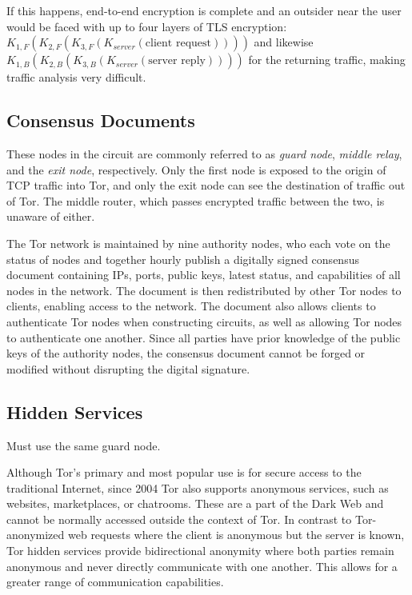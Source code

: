  If this happens, end-to-end encryption is complete and an outsider near the user would be faced with up to four layers of TLS encryption: $K_{1,F}(K_{2,F}(K_{3,F}(K_{server}(\textrm{client\ request}))))$ and likewise $K_{1,B}(K_{2,B}(K_{3,B}(K_{server}(\textrm{server\ reply}))))$ for the returning traffic, making traffic analysis very difficult.

\subsection{Consensus Documents}
\label{sec:ConsensusDocs}

These nodes in the circuit are commonly referred to as \textit{guard node}, \textit{middle relay}, and the \textit{exit node}, respectively. Only the first node is exposed to the origin of TCP traffic into Tor, and only the exit node can see the destination of traffic out of Tor. The middle router, which passes encrypted traffic between the two, is unaware of either.

The Tor network is maintained by nine authority nodes, who each vote on the status of nodes and together hourly publish a digitally signed consensus document containing IPs, ports, public keys, latest status, and capabilities of all nodes in the network. The document is then redistributed by other Tor nodes to clients, enabling access to the network. The document also allows clients to authenticate Tor nodes when constructing circuits, as well as allowing Tor nodes to authenticate one another. Since all parties have prior knowledge of the public keys of the authority nodes, the consensus document cannot be forged or modified without disrupting the digital signature.\cite{xin2009design}

\subsection{Hidden Services}
\label{sec:HiddenServices}

Must use the same guard node.\cite{bauer2007low}\cite{overlier2006locating}

Although Tor's primary and most popular use is for secure access to the traditional Internet, since 2004 Tor also supports anonymous services, such as websites, marketplaces, or chatrooms. These are a part of the Dark Web and cannot be normally accessed outside the context of Tor. In contrast to Tor-anonymized web requests where the client is anonymous but the server is known, Tor hidden services provide bidirectional anonymity where both parties remain anonymous and never directly communicate with one another. This allows for a greater range of communication capabilities.\cite{nicolussi2011human}

